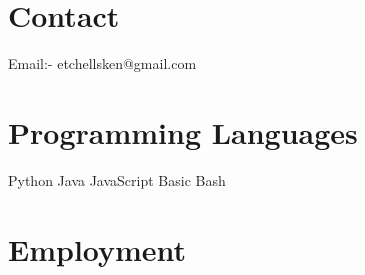 \documentclass[]{cv-style}          %
\begin{document}


\begin{aside}
%
\section{Contact}
Email:-
etchellsken@gmail.com
\section{Programming
   Languages}
Python
Java
JavaScript
Basic Bash
%
\end{aside}



\section{Employment}
\end{document}
